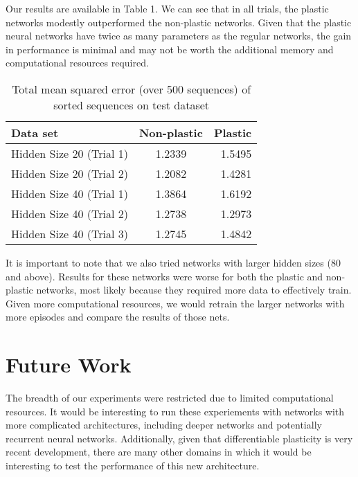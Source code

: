 \documentclass{article}
\begin{document}
Our results are available in Table 1. We can see that in all trials, the plastic networks modestly outperformed the non-plastic networks. Given that the plastic neural networks have twice as many parameters as the regular networks, the gain in performance is minimal and may not be worth the additional memory and computational resources required.

\begin{table}[t]
\caption{Total mean squared error (over 500 sequences) of sorted sequences on test dataset}
\label{sample-table}
\vskip 0.15in
\begin{center}
\begin{small}
\begin{sc}
\begin{tabular}{lcr}
\hline
\abovespace\belowspace
Data set & Non-plastic &  Plastic \\
\hline
\abovespace
Hidden Size 20 (Trial 1) & 1.2339 & 1.5495 \\
Hidden Size 20 (Trial 2) & 1.2082 & 1.4281 \\
Hidden Size 40 (Trial 1) & 1.3864 & 1.6192 \\
Hidden Size 40 (Trial 2) & 1.2738 & 1.2973 \\
\belowspace
Hidden Size 40 (Trial 3) & 1.2745 & 1.4842 \\
\hline
\end{tabular}
\end{sc}
\end{small}
\end{center}
\vskip -0.25in
\end{table}

It is important to note that we also tried networks with larger hidden sizes ($80$ and above). Results for these networks were worse for both the plastic and non-plastic networks, most likely because they required more data to effectively train. Given more computational resources, we would retrain the larger networks with more episodes and compare the results of those nets.


\section{Future Work}
The breadth of our experiments were restricted due to limited computational
resources. It would be interesting to run these experiements with networks with
more complicated architectures, including deeper networks and potentially
recurrent neural networks. Additionally, given that differentiable plasticity
is very recent development, there are many other domains in which it would be
interesting to test the performance of this new architecture.
\end{document}
